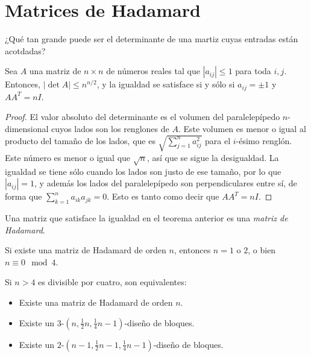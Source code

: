 \section{Matrices de Hadamard}
\label{section-matrices-de-hadamard}
¿Qué tan grande puede ser el determinante de
una martiz cuyas entradas están acotdadas?
\begin{theorem}[de Hadamard]
\label{theorem-combi-024}
Sea $A$ una matriz de $n\times n$ de números
reales tal que $|a_{ij}|\leq1$ para toda
$i,j$. Entonces, $|\det A|\leq n^{n/2}$, y la
igualdad se satisface si y sólo si $a_{ij} =
\pm1$ y $AA^T = nI$.
\end{theorem}
\begin{proof}
El valor absoluto del determinante es el
volumen del
paralelepípedo $n$-dimensional cuyos lados
son los renglones de $A$. Este volumen es
menor o igual al producto del tamaño de los
lados, que es $\sqrt{ \sum_{j = 1}^n
a_{ij}^2}$ para el $i$-ésimo renglón. Este
número es menor o igual que $\sqrt{n}$, así
que se sigue la desigualdad. La igualdad se
tiene sólo cuando los lados son justo de ese
tamaño, por lo que $|a_{ij}| = 1$, y además
los lados del paralelepípedo son
perpendiculares entre sí, de forma que $
\sum_{k = 1}^na_{ik}a_{jk} = 0$. Esto es
tanto como decir que $AA^T = nI$.
\end{proof}
\begin{definition}
\label{definition-combi-027}
Una matriz que satisface la igualdad en el
teorema anterior es una \emph{matriz de
Hadamard}.
\end{definition}
\begin{proposition}
\label{proposition-combi-006}
Si existe una matriz de Hadamard de orden
$n$, entonces $n = 1$ o $2$, o bien
$n\equiv0\mod4$.
\end{proposition}
\begin{theorem}
\label{theorem-combi-025}
Si $n>4$ es divisible por cuatro, son
equivalentes:
\begin{itemize}
\item Existe una matriz de Hadamard de orden
$n$.
\item Existe un $3$-$(n, \frac{1}{2}n,
\frac{1}{4}n-1)$-diseño de bloques.
\item Existe un $2$-$(n-1, \frac{1}{2}n-1,
\frac{1}{4}n-1)$-diseño de bloques.
\end{itemize}
\end{theorem}
